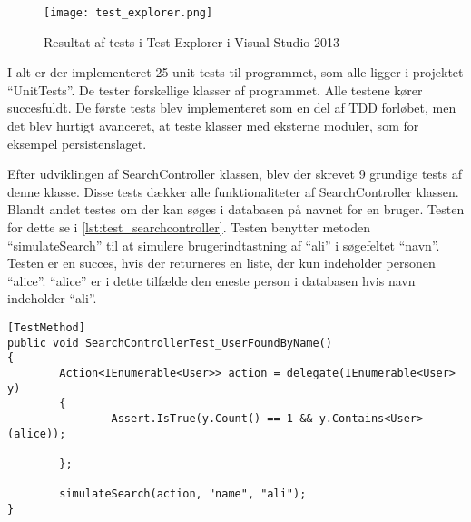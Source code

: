 \begin{figure}
  \centering
  \texttt{[image: test\_explorer.png]}
  \caption{Resultat af tests i Test Explorer i Visual Studio 2013}
  \label{fig:test_explorer}
\end{figure}

I alt er der implementeret 25 unit tests til programmet, som alle ligger i projektet \enquote{UnitTests}. De tester forskellige klasser af programmet. Alle testene kører succesfuldt. De første tests blev implementeret som en del af TDD forløbet, men det blev hurtigt avanceret, at teste klasser med eksterne moduler, som for eksempel persistenslaget. 

Efter udviklingen af SearchController klassen, blev der skrevet 9 grundige tests af denne klasse. Disse tests dækker alle funktionaliteter af SearchController klassen. Blandt andet testes om der kan søges i databasen på navnet for en bruger. Testen for dette se i \cref{lst:test_searchcontroller}. Testen benytter metoden \enquote{simulateSearch} til at simulere brugerindtastning af \enquote{ali} i søgefeltet \enquote{navn}. Testen er en succes, hvis der returneres en liste, der kun indeholder personen \enquote{alice}. \enquote{alice} er i dette tilfælde den eneste person i databasen hvis navn indeholder \enquote{ali}.

\begin{lstlisting}[label=lst:test_searchcontroller, caption={Eksempel på testfunktion}]
[TestMethod]
public void SearchControllerTest_UserFoundByName()
{
        Action<IEnumerable<User>> action = delegate(IEnumerable<User> y)
        {
                Assert.IsTrue(y.Count() == 1 && y.Contains<User>(alice));

        };

        simulateSearch(action, "name", "ali");
}
\end{lstlisting}
